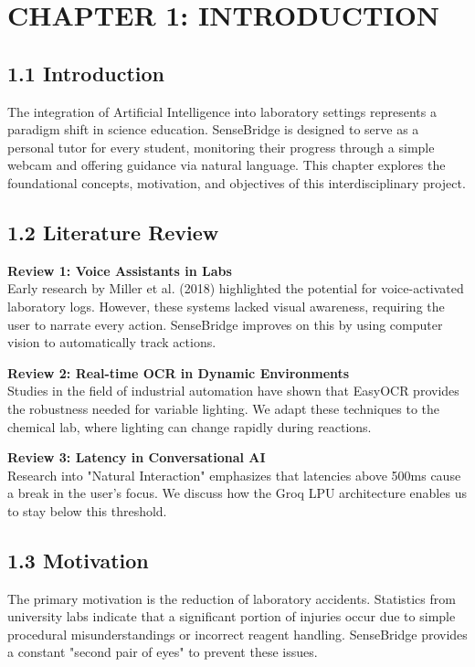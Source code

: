 \documentclass[12pt]{article}
\begin{document}
\newpage
\tableofcontents
\newpage

\section*{CHAPTER 1: INTRODUCTION}

\subsection*{1.1 Introduction}
The integration of Artificial Intelligence into laboratory settings represents a paradigm shift in science education. SenseBridge is designed to serve as a personal tutor for every student, monitoring their progress through a simple webcam and offering guidance via natural language. This chapter explores the foundational concepts, motivation, and objectives of this interdisciplinary project.

\subsection*{1.2 Literature Review}
\textbf{Review 1: Voice Assistants in Labs} \\
Early research by Miller et al. (2018) highlighted the potential for voice-activated laboratory logs. However, these systems lacked visual awareness, requiring the user to narrate every action. SenseBridge improves on this by using computer vision to automatically track actions.

\textbf{Review 2: Real-time OCR in Dynamic Environments} \\
Studies in the field of industrial automation have shown that EasyOCR provides the robustness needed for variable lighting. We adapt these techniques to the chemical lab, where lighting can change rapidly during reactions.

\textbf{Review 3: Latency in Conversational AI} \\
Research into "Natural Interaction" emphasizes that latencies above 500ms cause a break in the user's focus. We discuss how the Groq LPU architecture enables us to stay below this threshold.

\subsection*{1.3 Motivation}
The primary motivation is the reduction of laboratory accidents. Statistics from university labs indicate that a significant portion of injuries occur due to simple procedural misunderstandings or incorrect reagent handling. SenseBridge provides a constant "second pair of eyes" to prevent these issues.
\end{document}
